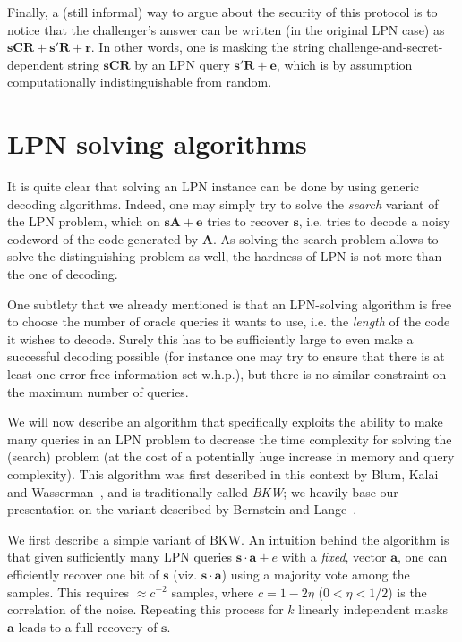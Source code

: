 \documentclass[11pt,a4paper]{article}
\theoremstyle{definition}
\begin{document}
Finally, a (still informal) way to argue about the security of this protocol is to notice that the challenger's answer can be written (in the original LPN case) as $\bm{s}\bm{CR} + \bm{s}'\bm{R} + \bm{r}$.
In other words, one is masking the string challenge-and-secret-dependent string $\bm{sCR}$ by an LPN query $\bm{s}'\bm{R} + \bm{e}$, which is by assumption computationally indistinguishable from random. 

\section{LPN solving algorithms}

It is quite clear that solving an LPN instance can be done by using generic decoding algorithms. Indeed, one may simply try to solve the \emph{search} variant of the LPN problem, which on $\bm{sA} + \bm{e}$ tries to
recover $\bm{s}$, i.e. tries to decode a noisy codeword of the code generated by $\bm{A}$. As solving the search problem allows to solve the distinguishing problem as well, the hardness of LPN
is not more than the one of decoding.

One subtlety that we already mentioned is that an LPN-solving algorithm is free to choose the number of oracle queries it wants to use, i.e. the \emph{length} of the code it wishes to decode. Surely this has
to be sufficiently large to even make a successful decoding possible (for instance one may try to ensure that there is at least one error-free information set w.h.p.), but there is no similar constraint
on the maximum number of queries.

We will now describe an algorithm that specifically exploits the ability to make many queries in an LPN problem to decrease the time complexity
for solving the (search) problem (at the cost of a potentially huge increase in memory and query complexity). This algorithm was first described in this context by Blum, Kalai and Wasserman~\cite{BKW},
and is traditionally called \emph{BKW}; we heavily base our presentation on the variant described by Bernstein and Lange~\cite{bunny}.

\smallskip

We first describe a simple variant of BKW. An intuition behind the algorithm is that given sufficiently many LPN queries $\bm{s}\cdot\bm{a} + e$ with a \emph{fixed}, vector $\bm{a}$,
one can efficiently recover one bit of $\bm{s}$ (viz. $\bm{s}\cdot\bm{a}$) using a majority vote among the samples. This requires $\approx c^{-2}$ samples, where $c = 1 - 2\eta$ ($0 < \eta < 1/2$)
is the correlation 
of the noise. Repeating this process for $k$ linearly independent masks $\bm{a}$ leads to a full recovery of $\bm{s}$.
\end{document}
